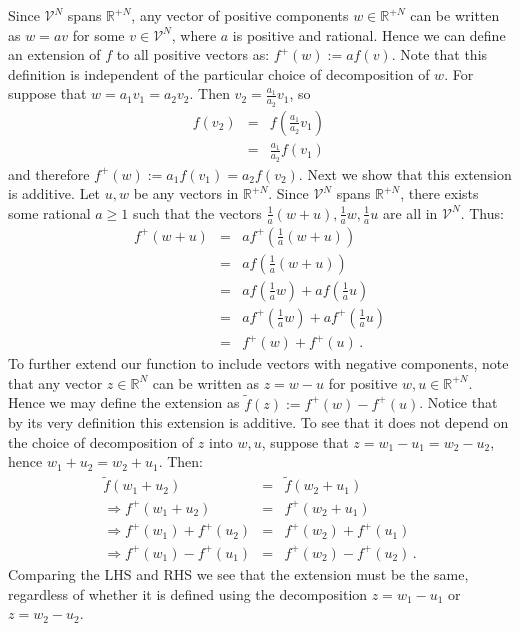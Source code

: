 \documentclass[%
 reprint,superscriptaddress,
 amsmath,amssymb,
 aps,pra, onecolumn, 12pt
]{revtex4-2}
\newcommand{\eqn}[1]{\begin{eqnarray} #1 \end{eqnarray}}
\begin{document}
\begin{appendix}
Since $\mathcal{V}^N$ spans $\mathbb{R}^{+ N}$, any vector of positive components $w \in \mathbb{R}^{+ N}$ can be written as $w = a v$ for some $v \in \mathcal{V}^N$, where $a$ is positive and rational. Hence we can define an extension of $f$ to all positive vectors as: $f^+(w) := a f(v)$. Note that this definition is independent of the particular choice of  decomposition of $w$. For suppose that $w = a_1 v_1 = a_2 v_2$. Then $v_2 = \frac{a_1}{a_2} v_1$, so
\eqn{
f(v_2) &=& f\left( \frac{a_1}{a_2} v_1 \right) \nonumber \\
&=& \frac{a_1}{a_2} f\left( v_1 \right) \,
}
and therefore $f^{+}(w) := a_1 f(v_1) = a_2 f(v_2)$. Next we show that this extension is additive. Let $u,w$ be any vectors in $\mathbb{R}^{+ N}$. Since $\mathcal{V}^N$ spans $\mathbb{R}^{+ N}$, there exists some rational $a \geq 1$ such that the vectors $\frac{1}{a}(w+u),\frac{1}{a}w, \frac{1}{a}u$ are all in $\mathcal{V}^N$. Thus:
\eqn{
f^{+}(w+u) &=& a f^{+}\left( \frac{1}{a}(w+u) \right) \nonumber \\
&=& a f\left( \frac{1}{a}(w+u) \right) \nonumber \\
&=& a f\left( \frac{1}{a}w \right) + a f\left( \frac{1}{a}u \right) \nonumber \\
&=& a f^{+}\left( \frac{1}{a}w \right) + a f^{+}\left( \frac{1}{a}u \right) \nonumber \\
&=& f^{+}\left( w \right) +  f^{+}\left( u \right) \, .
}
To further extend our function to include vectors with negative components, note that any vector $z \in \mathbb{R}^{N}$ can be written as $z = w-u$ for positive $w,u \in \mathbb{R}^{+ N}$. Hence we may define the extension as $ \tilde{f}(z) := f^{+}(w)-f^{+}(u)$. Notice that by its very definition this extension is additive. To see that it does not depend on the choice of decomposition of $z$ into $w,u$, suppose that $z = w_1 - u_1 = w_2 - u_2$, hence $w_1+u_2 = w_2+u_1$. Then:
\eqn{
\tilde{f}(w_1+u_2) &=& \tilde{f}(w_2+u_1) \nonumber \\
\Rightarrow f^{+}(w_1+u_2) &=& f^{+}(w_2+u_1) \nonumber \\
\Rightarrow f^{+}(w_1)+f^{+}(u_2) &=& f^{+}(w_2)+f^{+}(u_1) \nonumber \\
\Rightarrow f^{+}(w_1)-f^{+}(u_1) &=& f^{+}(w_2)-f^{+}(u_2) \, .
}
Comparing the LHS and RHS we see that the extension must be the same, regardless of whether it is defined using the decomposition $z = w_1 - u_1$ or $z = w_2 - u_2$.


\end{appendix}
\end{document}
